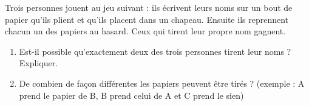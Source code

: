 
\begin{exercice}\label{exosmath-0188}

    Trois personnes jouent au jeu suivant : ils écrivent leurs noms sur un bout de papier qu'ils plient et qu'ils placent dans un chapeau. Ensuite ils reprennent chacun un des papiers au hasard. Ceux qui tirent leur propre nom gagnent.
    \begin{enumerate}
        \item
            Est-il possible qu'exactement deux des trois personnes tirent leur noms ? Expliquer.
        \item
            De combien de façon différentes les papiers peuvent être tirés ? (exemple : A prend le papier de B, B prend celui de A et C prend le sien) 
    \end{enumerate}


\end{exercice}

